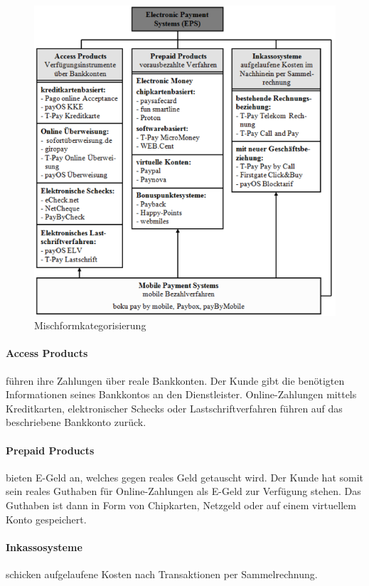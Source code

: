 \begin{figure}[hbp]
\centering
\includegraphics[width=1\textwidth]{img/Mischform.png}
\caption{Mischformkategorisierung}
\label{fig:mischform}
\end{figure}

\paragraph{Access Products} führen ihre Zahlungen über reale Bankkonten. Der Kunde gibt die benötigten Informationen seines Bankkontos an den Dienstleister. Online-Zahlungen mittels Kreditkarten, elektronischer Schecks oder Lastschriftverfahren führen auf das beschriebene Bankkonto zurück.

\paragraph{Prepaid Products} bieten E-Geld an, welches gegen reales Geld getauscht wird. Der Kunde hat somit sein reales Guthaben für Online-Zahlungen als E-Geld zur Verfügung stehen. Das Guthaben ist dann in Form von Chipkarten, Netzgeld oder auf einem virtuellem Konto ge\-speichert.

\paragraph{Inkassosysteme} schicken aufgelaufene Kosten nach Transaktionen per Sa\-mmelrechnung. 

